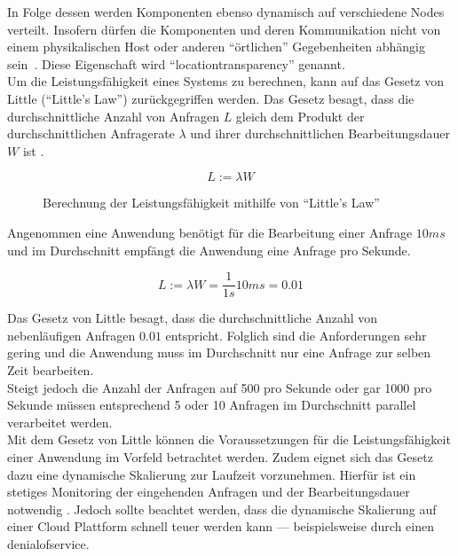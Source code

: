In Folge dessen werden Komponenten ebenso dynamisch auf verschiedene Nodes verteilt. Insofern dürfen die Komponenten und deren Kommunikation nicht von einem physikalischen Host oder anderen \enquote{örtlichen} Gegebenheiten abhängig sein~\cite[S.~8]{vernon_reactive_2016}. Diese Eigenschaft wird \enquote{\gls{locationtransparency}} genannt.\\

Um die Leistungsfähigkeit eines Systems zu berechnen, kann auf das Gesetz von Little (\enquote{Little's Law}) zurückgegriffen werden. Das Gesetz besagt, dass die durchschnittliche Anzahl von Anfragen $L$ gleich dem Produkt der durchschnittlichen Anfragerate $\lambda$ und ihrer durchschnittlichen Bearbeitungsdauer $W$ ist \cite[S.~41]{kuhn_reactive_2015}.

\begin{figure}[H]
  \[L := \lambda W\]
  \caption{Berechnung der Leistungsfähigkeit mithilfe von \enquote{Little's Law}}
\end{figure}

Angenommen eine Anwendung benötigt für die Bearbeitung einer Anfrage $10ms$ und im Durchschnitt empfängt die Anwendung eine Anfrage pro Sekunde. 

\begin{figure}[H]
  \[L := \lambda W = \frac{1}{1s} 10ms = 0.01\]
\end{figure}

\vspace{-0.5cm}

Das Gesetz von Little besagt, dass die durchschnittliche Anzahl von nebenläufigen Anfragen $0.01$ entspricht. Folglich sind die Anforderungen sehr gering und die Anwendung muss im Durchschnitt nur eine Anfrage zur selben Zeit bearbeiten.\\
Steigt jedoch die Anzahl der Anfragen auf 500 pro Sekunde oder gar 1000 pro Sekunde müssen entsprechend 5 oder 10 Anfragen im Durchschnitt parallel verarbeitet werden.\\
Mit dem Gesetz von Little können die Voraussetzungen für die Leistungsfähigkeit einer Anwendung im Vorfeld betrachtet werden. Zudem eignet sich das Gesetz dazu eine dynamische Skalierung zur Laufzeit vorzunehmen. Hierfür ist ein stetiges Monitoring der eingehenden Anfragen und der Bearbeitungsdauer notwendig \cite[S.~42]{kuhn_reactive_2015}. Jedoch sollte beachtet werden, dass die dynamische Skalierung auf einer Cloud Plattform schnell teuer werden kann --- beispielsweise durch einen \gls{denialofservice}.

